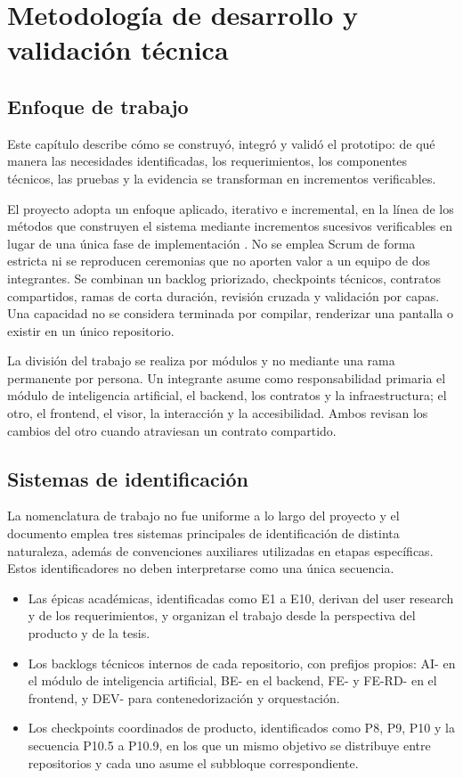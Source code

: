 \chapter{Metodología de desarrollo y validación técnica}
\label{chap:metodologia-validacion}

\section{Enfoque de trabajo}

Este capítulo describe cómo se construyó, integró y validó el prototipo: de qué manera las necesidades identificadas, los requerimientos, los componentes técnicos, las pruebas y la evidencia se transforman en incrementos verificables.

El proyecto adopta un enfoque aplicado, iterativo e incremental, en la línea de los métodos que construyen el sistema mediante incrementos sucesivos verificables en lugar de una única fase de implementación \parencite{larman_basili_iterative_incremental_2003}. No se emplea Scrum de forma estricta ni se reproducen ceremonias que no aporten valor a un equipo de dos integrantes. Se combinan un backlog priorizado, checkpoints técnicos, contratos compartidos, ramas de corta duración, revisión cruzada y validación por capas. Una capacidad no se considera terminada por compilar, renderizar una pantalla o existir en un único repositorio.

La división del trabajo se realiza por módulos y no mediante una rama permanente por persona. Un integrante asume como responsabilidad primaria el módulo de inteligencia artificial, el backend, los contratos y la infraestructura; el otro, el frontend, el visor, la interacción y la accesibilidad. Ambos revisan los cambios del otro cuando atraviesan un contrato compartido.

\section{Sistemas de identificación}

La nomenclatura de trabajo no fue uniforme a lo largo del proyecto y el documento emplea tres sistemas principales de identificación de distinta naturaleza, además de convenciones auxiliares utilizadas en etapas específicas. Estos identificadores no deben interpretarse como una única secuencia.

\begin{itemize}
\item Las épicas académicas, identificadas como E1 a E10, derivan del user research y de los requerimientos, y organizan el trabajo desde la perspectiva del producto y de la tesis.
\item Los backlogs técnicos internos de cada repositorio, con prefijos propios: AI- en el módulo de inteligencia artificial, BE- en el backend, FE- y FE-RD- en el frontend, y DEV- para contenedorización y orquestación.
\item Los checkpoints coordinados de producto, identificados como P8, P9, P10 y la secuencia P10.5 a P10.9, en los que un mismo objetivo se distribuye entre repositorios y cada uno asume el subbloque correspondiente.
\end{itemize}

